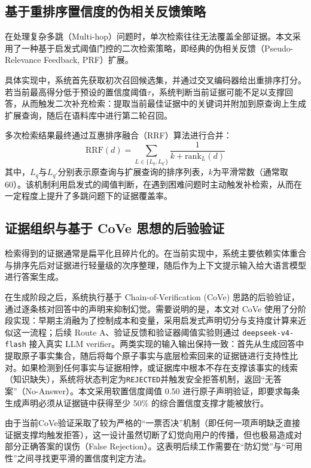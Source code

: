 \subsection[基于置信度的伪相关反馈]{基于重排序置信度的伪相关反馈策略}

在处理复杂多跳（Multi-hop）问题时，单次检索往往无法覆盖全部证据。本文采用了一种基于启发式阈值门控的二次检索策略，即经典的伪相关反馈（Pseudo-Relevance Feedback, PRF）扩展。

具体实现中，系统首先获取初次召回候选集，并通过交叉编码器给出重排序打分。若当前最高得分低于预设的置信度阈值$\tau$，系统判断当前证据可能不足以支撑回答，从而触发二次补充检索：提取当前最佳证据中的关键词并附加到原查询上生成扩展查询，随后在语料库中进行第二轮召回。

多次检索结果最终通过互惠排序融合（RRF）算法进行合并：
\begin{equation}
    \mathrm{RRF}(d)=\sum_{L \in \{L_q, L_{q'}\}}\frac{1}{k+\mathrm{rank}_L(d)}
    \label{equ:rrf}
\end{equation}
其中，$L_q$与$L_{q'}$分别表示原查询与扩展查询的排序列表，$k$为平滑常数（通常取60）。该机制利用启发式的阈值判断，在遇到困难问题时主动触发补检索，从而在一定程度上提升了多跳问题下的证据覆盖率。

\vspace{-0.4\baselineskip}
\subsection{证据组织与基于 CoVe 思想的后验验证}

检索得到的证据通常是扁平化且碎片化的。在当前实现中，系统主要依赖实体重合与排序先后对证据进行轻量级的次序整理，随后作为上下文提示输入给大语言模型进行答案生成。

在生成阶段之后，系统执行基于 Chain-of-Verification (CoVe)\cite{ref24} 思路的后验验证，通过逐条核对回答中的声明来抑制幻觉\cite{ref25}。需要说明的是，本文对 CoVe 使用了分阶段实现：早期主消融为了控制成本和变量，采用启发式声明切分与支持度计算来近似这一流程；后续 Route A、验证反馈和验证器阈值实验则通过 \texttt{deepseek-v4-flash} 接入真实 LLM verifier。两类实现的输入输出保持一致：首先从生成回答中提取原子事实集合，随后将每个原子事实与底层检索回来的证据链进行支持性比对。如果检测到任何事实与证据相悖，或证据库中根本不存在支撑该事实的线索（知识缺失），系统将状态判定为\texttt{REJECTED}并触发安全拒答机制，返回“无答案”（No-Answer）。本文采用软置信度阈值 0.50 进行原子声明验证，即要求每条生成声明必须从证据链中获得至少 50\% 的综合置信度支撑才能被放行。

由于当前CoVe验证采取了较为严格的“一票否决”机制（即任何一项声明缺乏直接证据支撑均触发拒答），这一设计虽然切断了幻觉向用户的传播，但也极易造成对部分正确答案的误伤（False Rejection）。这表明后续工作需要在“防幻觉”与“可用性”之间寻找更平滑的置信度判定方法。

